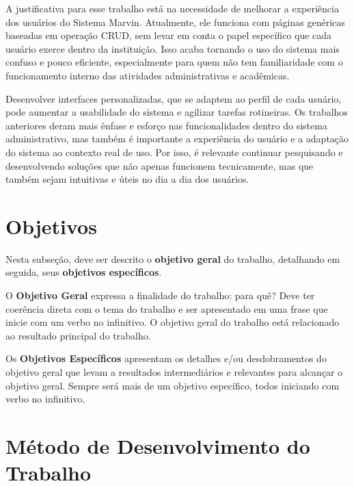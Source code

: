A justificativa para esse trabalho está na necessidade de melhorar a experiência dos usuários do Sistema Marvin. Atualmente, ele funciona com páginas genéricas baseadas em operação CRUD, sem levar em conta o papel específico que cada usuário exerce dentro da instituição. Isso acaba tornando o uso do sistema mais confuso e pouco eficiente, especialmente para quem não tem familiaridade com o funcionamento interno das atividades administrativas e acadêmicas.

Desenvolver interfaces personalizadas, que se adaptem ao perfil de cada usuário, pode aumentar a usabilidade do sistema e agilizar tarefas rotineiras. Os trabalhos anteriores deram mais ênfase e esforço nas funcionalidades dentro do sistema administrativo, mas também é importante a experiência do usuário e a adaptação do sistema ao contexto real de uso. Por isso, é relevante continuar pesquisando e desenvolvendo soluções que não apenas funcionem tecnicamente, mas que também sejam intuitivas e úteis no dia a dia dos usuários.

\section{Objetivos}
\label{sec-intro-obj}

Nesta subseção, deve ser descrito o \textbf{objetivo geral} do trabalho, detalhando em
seguida, seus \textbf{objetivos específicos}.

O \textbf{Objetivo Geral} expressa a finalidade do trabalho: para quê? Deve ter coerência
direta com o tema do trabalho e ser apresentado em uma frase que inicie com um verbo
no infinitivo. O objetivo geral do trabalho está relacionado ao resultado principal do trabalho.

Os \textbf{Objetivos Específicos} apresentam os detalhes e/ou desdobramentos do
objetivo geral que levam a resultados intermediários e relevantes para alcançar o objetivo geral. Sempre será mais de um objetivo específico, todos iniciando com verbo no infinitivo.




\section{Método de Desenvolvimento do Trabalho}
\label{sec-intro-met}

